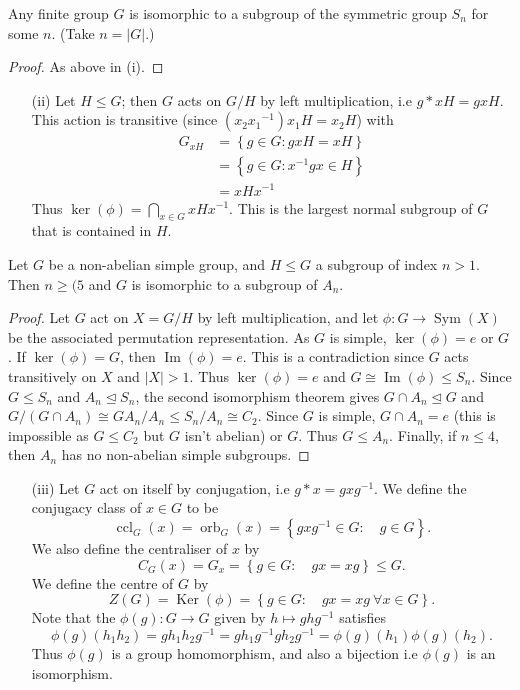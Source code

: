 \documentclass[a4paper]{scrartcl}
\begin{document}
 \begin{theorem}
     Any finite group $G$ is isomorphic to a subgroup of the symmetric group $S_{n}$ for some $n$. (Take $n=|G|$.)
 \end{theorem}
 \begin{proof}
       As above in (i).
 \end{proof}
 \begin{itemize}
      \item[(ii)] Let $H \leq G$; then $G$ acts on $G/H$ by left multiplication, i.e $g \ast x H= gxH$. This action is transitive (since $(x_2 {x_1 }^{-1})x_1 H=x_2 H$) with 
      \begin{align*}
          G_{xH}&=\left\{g \in G: gxH=xH\right\}\\&=\left\{g \in G: {x}^{-1}gx \in H\right\}\\&=xH {x}^{-1} 
      \end{align*} Thus $\operatorname{ker}(\phi)=\bigcap_{x \in G}xH {x}^{-1}$. This is the largest normal subgroup of $G$ that is contained in $H$.  
 \end{itemize}
 \begin{theorem}
       Let $G$ be a non-abelian simple group, and $H \leq G$ a subgroup of index $n>1$. Then $n \geq (5$ and $G$ is isomorphic to a subgroup of $A_{n}$.
 \end{theorem}
 \begin{proof}
     Let $G$ act on $X=G/H$ by left multiplication, and let $\phi: G \rightarrow \operatorname{Sym}(X)$ be the associated permutation representation. As $G$ is simple, $\operatorname{ker}(\phi)=e$ or $G$. If $\operatorname{ker}(\phi)=G$, then $\operatorname{Im}(\phi)=e$. This is a contradiction since $G$ acts transitively on $X$ and $|X|>1$. Thus $\operatorname{ker}(\phi)=e$ and $G \cong \operatorname{Im}(\phi) \leq S_{n}.$ Since $G \leq S_{n}$ and $A_n \unlhd S_n$, the second isomorphism theorem gives $G \cap A_n \unlhd G$ and $G/(G \cap A_n) \cong GA_n/A_n \leq S_n / A_n \cong C_2 $. Since $G$ is simple, $G \cap A_n=e$ (this is impossible as $G \leq C_2 $ but $G$ isn't abelian) or $G$. Thus $G \leq A_{n} $. Finally, if $n \leq 4$, then $A_n$ has no non-abelian simple subgroups.
 \end{proof}
\begin{itemize}
     \item[(iii)] Let $G$ act on itself by conjugation, i.e $g \ast x= gx {g}^{-1}$. We define the conjugacy class of $x \in G$ to be \[
     \operatorname{ccl}_G (x)=\operatorname{orb}_{G}(x)=\left\{gx {g}^{-1} \in G: \quad g \in G\right\}
     .\] We also define the centraliser of $x$ by \[
     C_{G}(x)=G_{x}= \left\{g \in G: \quad gx=xg\right\} \leq G
     .\] We define the centre of $G$ by \[
     Z (G)=\operatorname{Ker}(\phi)=\left\{g \in G: \quad gx=xg \ \forall x \in G\right\}
     .\] Note that the $\phi (g): G \rightarrow G$ given by $h \mapsto gh {g}^{-1}$ satisfies \[
     \phi (g)(h_1 h_2 )=gh_1 h_2 {g}^{-1}=gh_1 {g}^{-1} gh_2 {g}^{-1} =\phi (g)(h_1 )\phi (g)(h_2 )
     .\]  Thus $\phi (g)$ is a group homomorphism, and also a bijection i.e $\phi (g)$ is an isomorphism. 
\end{itemize}
\end{document}
